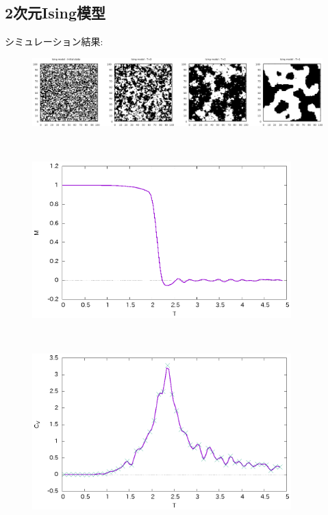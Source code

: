 \documentclass[10.5pt,a4paper]{jreport}
\begin{document}
\subsection{2次元Ising模型}
シミュレーション結果:
\begin{figure}[htbp]
  \begin{center}
    \includegraphics[width = 17cm]{./spin.eps}
  \end{center}
  \label{fig1}
\end{figure}\\
\begin{figure}[htbp]
  \begin{center}
    \includegraphics[width = 10cm]{./magnetization.eps}
  \end{center}
  \label{fig2}
\end{figure}\\
\begin{figure}[htbp]
  \begin{center}
    \includegraphics[width = 10cm]{./specificheat.eps}
  \end{center}
  \label{fig2}
\end{figure}\\
\end{document}
